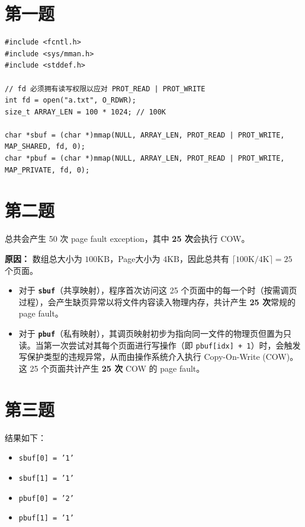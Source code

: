 \documentclass[fleqn]{ctexart}
\begin{document}
\section*{第一题}
\begin{verbatim}
#include <fcntl.h>
#include <sys/mman.h>
#include <stddef.h>

// fd 必须拥有读写权限以应对 PROT_READ | PROT_WRITE
int fd = open("a.txt", O_RDWR);
size_t ARRAY_LEN = 100 * 1024; // 100K 

char *sbuf = (char *)mmap(NULL, ARRAY_LEN, PROT_READ | PROT_WRITE, MAP_SHARED, fd, 0);
char *pbuf = (char *)mmap(NULL, ARRAY_LEN, PROT_READ | PROT_WRITE, MAP_PRIVATE, fd, 0);
\end{verbatim}

\section*{第二题}
总共会产生 50 次 page fault exception，其中 \textbf{25 次}会执行 COW。

\textbf{原因：}
数组总大小为 $100\text{KB}$，Page大小为 $4\text{KB}$，因此总共有 $\lceil 100\text{K} / 4\text{K} \rceil = 25$ 个页面。
\begin{itemize}
    \item 对于 \textbf{\texttt{sbuf}}（共享映射），程序首次访问这 25 个页面中的每一个时（按需调页过程），会产生缺页异常以将文件内容读入物理内存，共计产生 \textbf{25 次}常规的 page fault。
    \item 对于 \textbf{\texttt{pbuf}}（私有映射），其调页映射初步为指向同一文件的物理页但置为只读。当第一次尝试对其每个页面进行写操作（即 \texttt{pbuf[idx] + 1}）时，会触发写保护类型的违规异常，从而由操作系统介入执行 Copy-On-Write (COW)。这 25 个页面共计产生 \textbf{25 次} COW 的 page fault。
\end{itemize}

\section*{第三题}
结果如下：
\begin{itemize}
    \item \texttt{sbuf[0] = '1'}
    \item \texttt{sbuf[1] = '1'}
    \item \texttt{pbuf[0] = '2'}
    \item \texttt{pbuf[1] = '1'}
\end{itemize}
\end{document}
